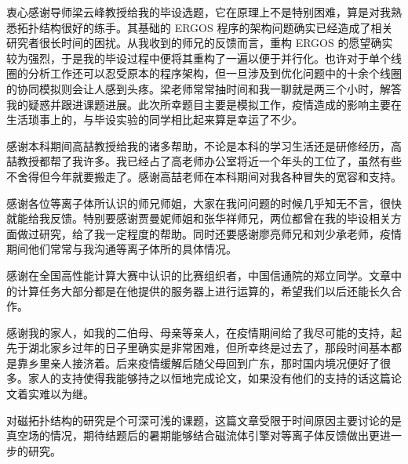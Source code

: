\begin{acknowledgement}
  衷心感谢导师梁云峰教授给我的毕设选题，它在原理上不是特别困难，算是对我熟悉拓扑结构很好的练手。其基础的 ERGOS 程序的架构问题确实已经造成了相关研究者很长时间的困扰。从我收到的师兄的反馈而言，重构 ERGOS 的愿望确实较为强烈，于是我的毕设过程中便将其重构了一遍以便于并行化。也许对于单个线圈的分析工作还可以忍受原本的程序架构，但一旦涉及到优化问题中的十余个线圈的协同模拟则会让人感到头疼。梁老师常常抽时间和我一聊就是两三个小时，解答我的疑惑并跟进课题进展。此次所幸题目主要是模拟工作，疫情造成的影响主要在生活琐事上的，与毕设实验的同学相比起来算是幸运了不少。
  
  感谢本科期间高喆教授给我的诸多帮助，不论是本科的学习生活还是研修经历，高喆教授都帮了我许多。我已经占了高老师办公室将近一个年头的工位了，虽然有些不舍得但今年就要搬走了。感谢高喆老师在本科期间对我各种冒失的宽容和支持。
  
  感谢各位等离子体所认识的师兄师姐，大家在我问问题的时候几乎知无不言，很快就能给我反馈。特别要感谢贾曼妮师姐和张华祥师兄，两位都曾在我的毕设相关方面做过研究，给了我一定程度的帮助。同时还要感谢廖亮师兄和刘少承老师，疫情期间他们常常与我沟通等离子体所的具体情况。

  感谢在全国高性能计算大赛中认识的比赛组织者，中国信通院的郑立同学。文章中的计算任务大部分都是在他提供的服务器上进行运算的，希望我们以后还能长久合作。

  感谢我的家人，如我的二伯母、母亲等亲人，在疫情期间给了我尽可能的支持，起先于湖北家乡过年的日子里确实是非常困难，但所幸终是过去了，那段时间基本都是靠乡里亲人接济着。后来疫情缓解后随父母回到广东，那时国内境况便好了很多。家人的支持使得我能够持之以恒地完成论文，如果没有他们的支持的话这篇论文着实难以为继。


  对磁拓扑结构的研究是个可深可浅的课题，这篇文章受限于时间原因主要讨论的是真空场的情况，期待结题后的暑期能够结合磁流体引擎对等离子体反馈做出更进一步的研究。
\end{acknowledgement}
